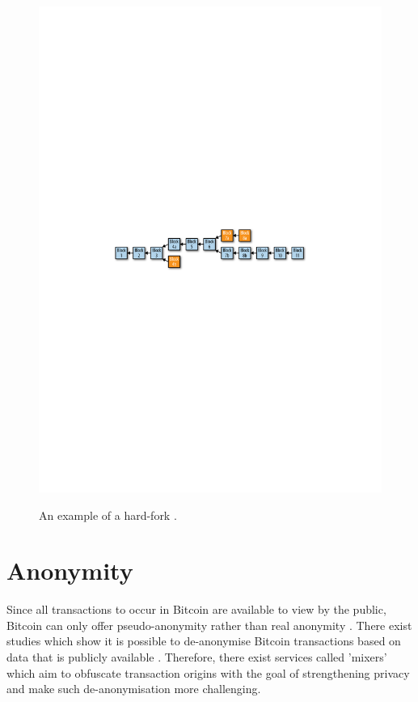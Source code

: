 \begin{figure}[h!]
  \centering
  \includegraphics[width = 15cm]{./figures/hard-fork.pdf}\\[0.5cm] 
  \caption{An example of a hard-fork \cite{RefWorks:doc:5c39e80ae4b0854ae611b047}.}
  \label{fig:hard-fork}
\end{figure}


\section{Anonymity}\label{background-anonymity}

Since all transactions to occur in Bitcoin are available to view by the public, Bitcoin can only offer pseudo-anonymity rather than real anonymity \cite{RefWorks:doc:5c3db7d6e4b0fa2b1fe68b48}. There exist studies which show it is possible to de-anonymise Bitcoin transactions based on data that is publicly available \cite{RefWorks:doc:5c3db7d6e4b0fa2b1fe68b48}. Therefore, there exist services called 'mixers' which aim to obfuscate transaction origins with the goal of strengthening privacy and make such de-anonymisation more challenging. 

